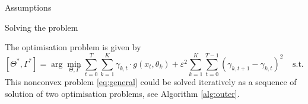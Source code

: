 \documentclass[final,hyperref={pdfpagelabels=false}]{beamer}
\begin{document}
\begin{frame}[t]
\begin{columns}[t]
\begin{column}{.48\textwidth}
\begin{block}{Assumptions}
\end{block}




\begin{block}{Solving the problem}

The optimisation problem is given by
\begin{equation}
\label{eq:general}
 [\Theta^{*}, \Gamma^{*} ] = 
  \arg \min\limits_{\Theta,\Gamma} \sum\limits_{t=0}^{T} \sum\limits_{k=1}^{K} \gamma_{k,t} \cdot g(x_t, \theta_k)
  + \varepsilon^2 \sum\limits_{k=1}^K \sum\limits_{t=0}^{T-1} (\gamma_{k,t+1} - \gamma_{k,t})^2 ~~~
 ~~ \textrm{s.t.} ~~ 0 \leq \gamma_{k,t} \leq 1, ~
 \forall t: \sum\limits_{k=1}^K \gamma_{k,t} = 1.
\end{equation}
This nonconvex problem \eqref{eq:general} could be solved iteratively as a sequence of solution of two optimisation problems, see Algorithm \ref{alg:outer}.

\begin{columns}[T]
\begin{column}{0.02\linewidth}\end{column}

\begin{column}{0.45\linewidth}
	\begin{center}
	\begin{table}[h!]
	\renewcommand{\tablename}{Algorithm}
	\caption{\label{alg:outer} \bf Outer algorithm.}
	\end{table}
	\end{center}


\end{column}
\end{columns}
\end{block}
\end{column}
\end{columns}
\end{frame}
\end{document}
